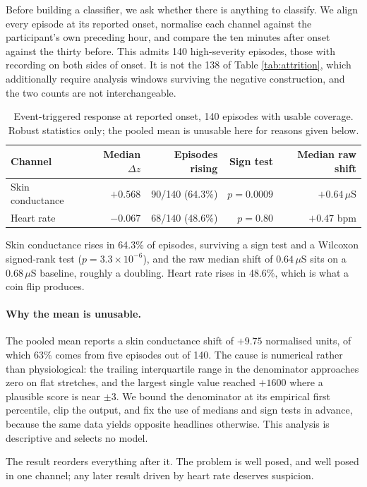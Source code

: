 \documentclass{article}
\begin{document}
Before building a classifier, we ask whether there is anything to classify. We
align every episode at its reported onset, normalise each channel against the
participant's own preceding hour, and compare the ten minutes after onset
against the thirty before. This admits 140 high-severity episodes, those with
recording on both sides of onset. It is not the 138 of Table
\ref{tab:attrition}, which additionally require analysis windows surviving the
negative construction, and the two counts are not interchangeable.

\begin{table}[t]
\caption{Event-triggered response at reported onset, 140 episodes with usable
coverage. Robust statistics only; the pooled mean is unusable here for reasons
given below.}
\label{tab:onset}
\centering
\begin{tabular}{lrrrr}
\toprule
Channel & Median $\Delta z$ & Episodes rising & Sign test & Median raw shift \\
\midrule
Skin conductance & $+0.568$ & 90/140 (64.3\%) & $p = 0.0009$ &
  $+0.64\,\mu$S \\
Heart rate & $-0.067$ & 68/140 (48.6\%) & $p = 0.80$ & $+0.47$ bpm \\
\bottomrule
\end{tabular}
\end{table}

Skin conductance rises in 64.3\% of episodes, surviving a sign test and a
Wilcoxon signed-rank test ($p = 3.3\times10^{-6}$), and the raw median shift of
$0.64\,\mu$S sits on a $0.68\,\mu$S baseline, roughly a doubling. Heart rate
rises in 48.6\%, which is what a coin flip produces.

\paragraph{Why the mean is unusable.} The pooled mean reports a skin
conductance shift of $+9.75$ normalised units, of which 63\% comes from five
episodes out of 140. The cause is numerical rather than physiological: the
trailing interquartile range in the denominator approaches zero on flat
stretches, and the largest single value reached $+1600$ where a plausible score
is near $\pm3$. We bound the denominator at its empirical first percentile,
clip the output, and fix the use of medians and sign tests in advance, because
the same data yields opposite headlines otherwise. This analysis is descriptive
and selects no model.

The result reorders everything after it. The problem is well posed, and well
posed in one channel; any later result driven by heart rate deserves suspicion.
\end{document}
